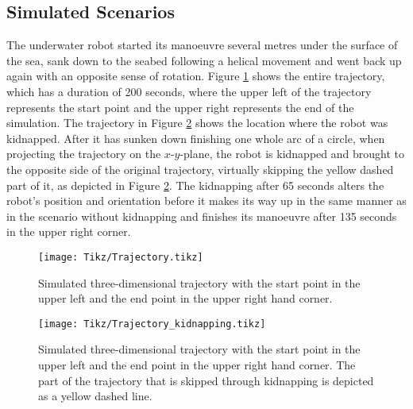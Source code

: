 \subsection{Simulated Scenarios}

The underwater robot started its manoeuvre several metres under the surface of the sea, sank down to the seabed following a helical movement and went back up again with an opposite sense of rotation. Figure \ref{fig:trajectory} shows the entire trajectory, which has a duration of 200 seconds, where the upper left of the trajectory represents the start point and the upper right represents the end of the simulation. The trajectory in Figure \ref{fig:trajectory_kidnapping} shows the location where the robot was kidnapped. After it has sunken down finishing one whole arc of a circle, when projecting the trajectory on the $x$-$y$-plane, the robot is kidnapped and brought to the opposite side of the original trajectory, virtually skipping the yellow dashed part of it, as depicted in Figure \ref{fig:trajectory_kidnapping}. The kidnapping after 65 seconds alters the robot's position and orientation before it makes its way up in the same manner as in the scenario without kidnapping and finishes its manoeuvre after 135 seconds in the upper right corner.


\begin{figure}
	\centering
	\setlength\figureheight{0.4\textheight} 	
	\setlength{}		
	\texttt{[image: Tikz/Trajectory.tikz]}			
	\caption[Simulated three-dimensional trajectory.]{Simulated three-dimensional trajectory with the start point in the upper left and the end point in the upper right hand corner.}		
	\label{fig:trajectory}			
\end{figure}

\begin{figure}
	\centering
	\setlength\figureheight{0.4\textheight} 	
	\setlength{}		
	\texttt{[image: Tikz/Trajectory\_kidnapping.tikz]}			
	\caption[Simulated three-dimensional trajectory depicting kidnapping.]{Simulated three-dimensional trajectory with the start point in the upper left and the end point in the upper right hand corner. The part of the trajectory that is skipped through kidnapping is depicted as a yellow dashed line.}		
	\label{fig:trajectory_kidnapping}			
\end{figure}


